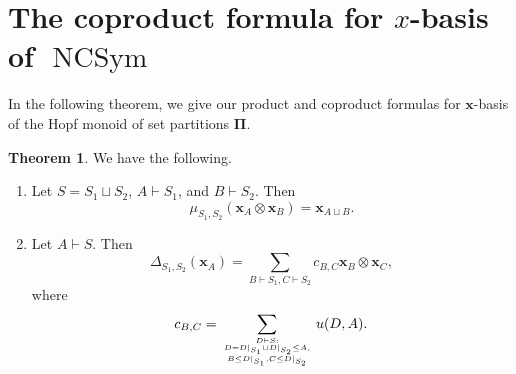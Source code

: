 \documentclass[12pt]{amsart}  %
\theoremstyle{definition}
\newtheorem{theorem}{Theorem}[section]
\theoremstyle{remark}
\numberwithin{equation}{section}
\newcommand{\ncp}{\mathbf{p}}
\newcommand{\NCSym}{\ensuremath{\operatorname{NCSym}}}
\newcommand{\mnc}{{m}}           	%
\newcommand{\pnc}{{p}}                %
\newcommand{\xnc}{{x}}                 %
\newcommand{\xhm}{\mathbf{x}}
\newcommand{\bPi}{{\mathbf{\Pi}}}
\newcommand{\mymu}{{u}}
\newcommand\svw[1]{{\color{black}{#1}}}
\begin{document}
 
\section{The coproduct formula for \svw{the} $\xnc$-basis of $\NCSym$}\label{sec:coproduct} 


%
%
%


In the following theorem, we give our product and coproduct formulas for \svw{the} $\xhm$-basis of the Hopf monoid of set partitions $\bPi$. 
\begin{theorem}\label{thm:prod-coprod}
We have the following. 
\begin{enumerate} 
\item Let $S= S_1\sqcup S_2$, $A\vdash S_1$, and $B\vdash S_2$. Then $$\mu_{S_1,S_2}(\xhm_A\otimes \xhm_B)=\xhm_{A\sqcup B}.$$
\item Let $A\vdash S$. Then 
$$\Delta_{S_1,S_2}(\xhm_A)=\sum_{B\vdash S_1,C\vdash S_2} c_{B,C} \xhm_{B} \otimes \xhm_{C},$$
where 
$$c_{B,C}=\sum_{D\vdash S: \atop{D=D|_{S_1} \sqcup D|_{S_2}\leq A, \atop B \leq D|_{S_1},C\leq D|_{S_2}}} \mymu(D,A).$$
\end{enumerate} 
\end{theorem} 
\end{document}
